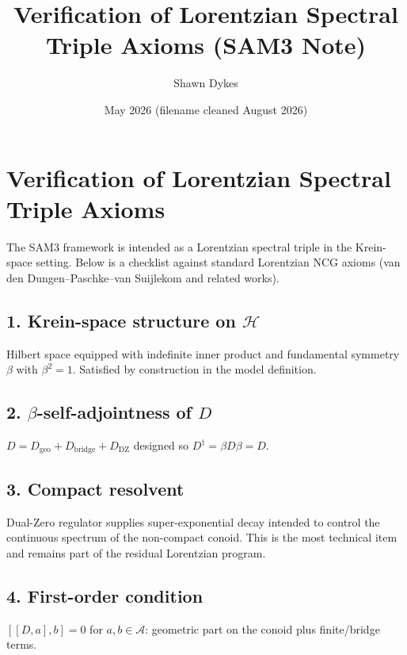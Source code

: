 \documentclass[11pt,a4paper]{article}
\title{Verification of Lorentzian Spectral Triple Axioms (SAM3 Note)}
\author{Shawn Dykes}
\date{May 2026 (filename cleaned August 2026)}
\begin{document}
\maketitle

\begin{center}
\end{center}

\vspace{1em}

\section{Verification of Lorentzian Spectral Triple Axioms}

The SAM3 framework is intended as a Lorentzian spectral triple in the Krein-space setting. Below is a checklist against standard Lorentzian NCG axioms (van den Dungen--Paschke--van Suijlekom and related works).

\subsection{1. Krein-space structure on $\mathcal{H}$}
Hilbert space equipped with indefinite inner product and fundamental symmetry $\beta$ with $\beta^2=1$. Satisfied by construction in the model definition.

\subsection{2. $\beta$-self-adjointness of $D$}
$D = D_{\mathrm{geo}} + D_{\mathrm{bridge}} + D_{\mathrm{DZ}}$ designed so $D^\dagger = \beta D \beta = D$.

\subsection{3. Compact resolvent}
Dual-Zero regulator supplies super-exponential decay intended to control the continuous spectrum of the non-compact conoid. This is the most technical item and remains part of the residual Lorentzian program.

\subsection{4. First-order condition}
$[[D,a],b]=0$ for $a,b\in\mathcal{A}$: geometric part on the conoid plus finite/bridge terms.
\end{document}
